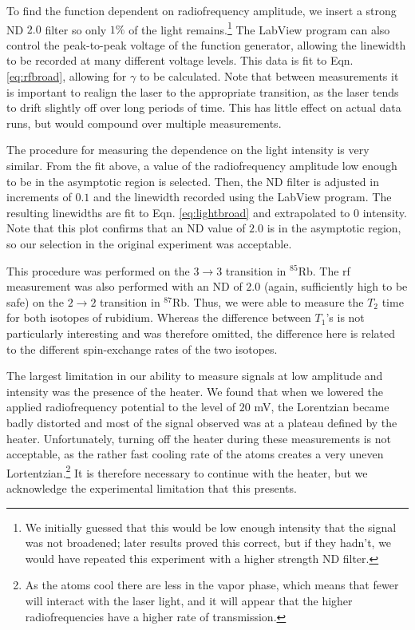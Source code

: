 To find the function dependent on radiofrequency amplitude, we insert a strong ND $2.0$ filter so only $1\%$ of the light remains.\footnote{We initially guessed that this would be low enough intensity that the signal was not broadened; later results proved this correct, but if they hadn't, we would have repeated this experiment with a higher strength ND filter.} The LabView program can also control the peak-to-peak voltage of the function generator, allowing the linewidth to be recorded at many different voltage levels. This data is fit to Eqn. \ref{eq:rfbroad}, allowing for $\gamma$ to be calculated. Note that between measurements it is important to realign the laser to the appropriate transition, as the laser tends to drift slightly off over long periods of time. This has little effect on actual data runs, but would compound over multiple measurements.

The procedure for measuring the dependence on the light intensity is very similar. From the fit above, a value of the radiofrequency amplitude low enough to be in the asymptotic region is selected. Then, the ND filter is adjusted in increments of $0.1$ and the linewidth recorded using the LabView program. The resulting linewidths are fit to Eqn. \ref{eq:lightbroad} and extrapolated to 0 intensity.  Note that this plot confirms that an ND value of $2.0$ is in the asymptotic region, so our selection in the original experiment was acceptable.

This procedure was performed on the $3\rightarrow3$ transition in $^{85}$Rb. The rf measurement was also performed with an ND of $2.0$ (again, sufficiently high to be safe) on the $2\rightarrow2$ transition in $^{87}$Rb. Thus, we were able to measure the $T_{2}$ time for both isotopes of rubidium. Whereas the difference between $T_{1}$'s is not particularly interesting and was therefore omitted, the difference here is related to the different spin-exchange rates of the two isotopes.

The largest limitation in our ability to measure signals at low amplitude and intensity was the presence of the heater. We found that when we lowered the applied radiofrequency potential to the level of $20$ mV, the Lorentzian became badly distorted and most of the signal observed was at a plateau defined by the heater. Unfortunately, turning off the heater during these measurements is not acceptable, as the rather fast cooling rate of the atoms creates a very uneven Lortentzian.\footnote{As the atoms cool there are less in the vapor phase, which means that fewer will interact with the laser light, and it will appear that the higher radiofrequencies have a higher rate of transmission.} It is therefore necessary to continue with the heater, but we acknowledge the experimental limitation that this presents.

